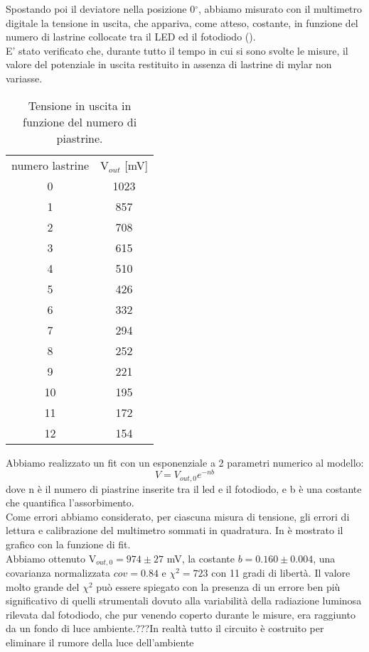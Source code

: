  Spostando poi il deviatore nella posizione 0$^\circ$, abbiamo misurato con il multimetro digitale la tensione in uscita, che appariva, come atteso, costante, in funzione del numero di lastrine collocate tra il LED ed il fotodiodo ().\\ E' stato verificato che, durante tutto il tempo in cui si sono svolte le misure, il valore del potenziale in uscita restituito in assenza di lastrine di mylar non variasse. 
\begin{table}[h]
	\centering
	\begin{tabular}{cc}		
		{numero lastrine} & {V$_{out}$ [mV]}\\
                      0 & 1023\\
                      1 & 857\\
                      2 & 708\\
                      3 & 615\\
                      4 & 510\\
                      5 & 426\\
                      6 & 332\\
                      7 & 294\\
                      8 & 252\\
                      9 & 221\\
                     10 & 195\\
                     11 & 172\\
                     12 & 154\\
	           \midrule
	
 	\end{tabular}
	\caption{Tensione in uscita in funzione del numero di piastrine. }
	\label{t:Fotodiodo}
\end{table}
Abbiamo realizzato un fit con un esponenziale a 2 parametri numerico al modello:
\begin{equation}
V=V_{out,0}e^{-nb}
\end{equation}
dove n è il numero di piastrine inserite tra il led e il fotodiodo, e b è una costante che quantifica l'assorbimento.\\
 Come errori abbiamo considerato, per ciascuna misura di tensione, gli errori di lettura e calibrazione del multimetro sommati in quadratura. In  è mostrato il grafico con la funzione di fit.\\
Abbiamo ottenuto V$_{out,0} = 974 \pm 27$ mV, la costante $b = 0.160 \pm 0.004$, una covarianza normalizzata $cov = 0.84$ e $\chi^2 = 723$ con 11 gradi di libertà. Il valore molto grande del $\chi^2$ può essere spiegato con la presenza di un errore ben più significativo di quelli strumentali dovuto alla variabilità della radiazione luminosa rilevata dal fotodiodo, che pur venendo coperto durante le misure, era raggiunto da un fondo di luce ambiente.???In realtà tutto il circuito è costruito per eliminare il rumore della luce dell'ambiente\\
